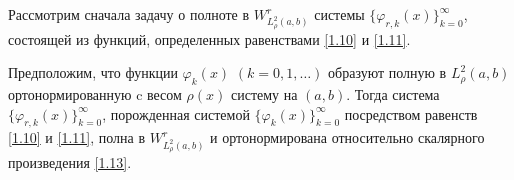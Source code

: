  Рассмотрим сначала задачу о полноте в $W^r_{L^2_\rho(a,b)}$ системы $\{\varphi_{r,k}(x)\}_{k=0}^\infty$, состоящей из функций, определенных равенствами   \eqref{1.10} и \eqref{1.11}.
 \begin{theorem} Предположим, что    функции $\varphi_k(x)$ $(k=0,1,\ldots)$ образуют полную в $L^2_\rho(a,b)$ ортонормированную   c весом   $\rho(x)$ систему на  $(a,b)$. Тогда система $\{\varphi_{r,k}(x)\}_{k=0}^\infty$, порожденная системой $\{\varphi_{k}(x)\}_{k=0}^\infty$ посредством равенств \eqref{1.10} и \eqref{1.11}, полна  в $W^r_{L^2_\rho(a,b)}$ и ортонормирована относительно скалярного произведения \eqref{1.13}.
 \end{theorem}

